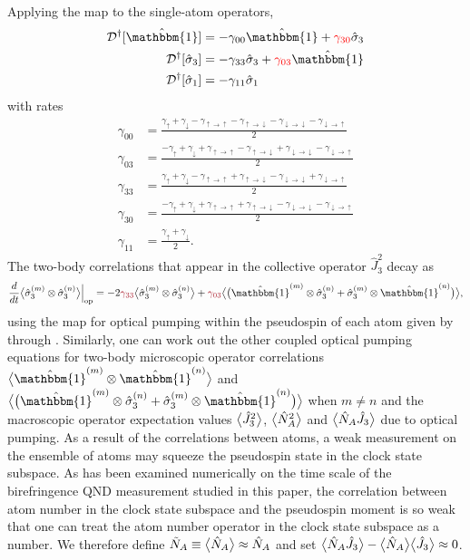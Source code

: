 \documentclass[preprint,aps,pra,onecolumn]{revtex4-1} %
\newcommand{\jz}{\hat{J}_3}
\newcommand{\gammauu}{\gamma_{\uparrow \rightarrow \uparrow}}
\newcommand{\gammadd}{\gamma_{\downarrow \rightarrow \downarrow}}
\newcommand{\gammaud}{\gamma_{\uparrow \rightarrow \downarrow}}
\newcommand{\gammadu}{\gamma_{\downarrow \rightarrow \uparrow}}
\newcommand{\comment}[1]{{\color{Maroon} #1}}
\newcommand{\error}[1]{{\color{red} #1}}
\begin{document}
\begin{appendix}
Applying the map to the single-atom operators, 
	\begin{align}
		\mathcal{D}\dg[\hat{\mathbbm{1}}] & = - \gamma_{00} \hat{\mathbbm{1}} +\error{\gamma_{30}} \hat{\sigma}_3 \label {Eq::Idecay} \\
		\mathcal{D}\dg[\hat{\sigma}_3] & =- \gamma_{33} \hat{\sigma}_3 +  \error{\gamma_{03}} \hat{\mathbbm{1}} 
\label{Eq::zdecay} \\
		\mathcal{D}\dg[\hat{\sigma}_1] & = - \gamma_{11} \hat{\sigma}_1\label{Eq::xdecay}
	\end{align}
with rates	
	\begin{align}
		\gamma_{00} 
			& = \frac{\gamma_{\uparrow}+\gamma_{\downarrow} - \gammauu-\gammaud  -\gammadd-\gammadu}{2} \\
			\gamma_{03} 
			& = \frac{-\gamma_{\uparrow}+\gamma_{\downarrow} +\gammauu-\gammaud +\gammadd-\gammadu }{2}\\		
		\gamma_{33} 
			& = \frac{\gamma_{\uparrow}+\gamma_{\downarrow} - \gammauu+\gammaud  -\gammadd+\gammadu}{2}\\
			\gamma_{30} 
			& = \frac{-\gamma_{\uparrow}+\gamma_{\downarrow} +\gammauu+\gammaud -\gammadd-\gammadu }{2} \\
			\gamma_{11} 
			& = \frac{\gamma_{\uparrow}+\gamma_{\downarrow}}{2}. \label{Eq::frate}
	\end{align}
The two-body correlations that appear in the collective operator $\jz^2$ decay as
	\begin{align}
		\frac{d}{dt} \expect{\hat{\sigma}_3^{(m)} \otimes \hat{\sigma}_3^{(n)} }  \Big|_{\rm op} = - 2 \comment{\gamma_{33}}  \expect{\hat{\sigma}_3^{(m)} \otimes \hat{\sigma}_3^{(n)}} + \comment{\gamma_{03}} \expect{\big(\hat{\mathbbm{1}}^{(m)} \otimes \hat{\sigma}_3^{(n)} + \hat{\sigma}_3^{(m)} \otimes \hat{\mathbbm{1}}^{(n)}\big)},
	\end{align}
using the map for optical pumping within the pseudospin of each atom given by  through .  
Similarly, one can work out the other coupled optical pumping equations for two-body microscopic operator correlations $ \expect{\hat{\mathbbm{1}}^{(m)} \otimes \hat{\mathbbm{1}}^{(n)}} $ and $ \expect{\big(\hat{\mathbbm{1}}^{(m)} \otimes \hat{\sigma}_3^{(n)} + \hat{\sigma}_3^{(m)} \otimes \hat{\mathbbm{1}}^{(n)}\big)} $ when $ m\neq n $ and the macroscopic operator expectation values $ \big\langle \hat{J}_3^2 \big\rangle $, $ \big\langle \hat{N}_A^2 \big\rangle $ and $ \big\langle \hat{N}_A\hat{J}_3 \big\rangle $ due to optical pumping. 
As a result of the correlations between atoms, a weak measurement on the ensemble of atoms may squeeze the pseudospin state in the clock state subspace. 
As has been examined numerically on the time scale of the birefringence QND measurement studied in this paper, the correlation between atom number in the clock state subspace and the pseudospin moment is so weak that one can treat the atom number operator in the clock state subspace as a number.
We therefore define $ \tilde{N}_A\equiv \big\langle \hat{N}_A \big\rangle\approx \hat{N}_A $ and set $ \big\langle \hat{N}_A\hat{J}_3 \big\rangle-\big\langle \hat{N}_A \big\rangle\big\langle \hat{J}_3 \big\rangle\approx 0 $. 


\end{appendix}
\end{document}
